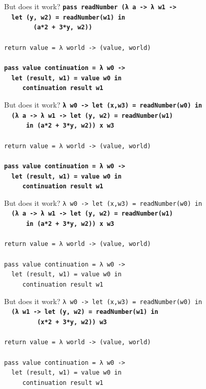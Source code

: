 \documentclass{beamer}
\begin{document}
\begin{frame}{But does it work?}
  \texttt{\textbf{pass readNumber (λ a -> λ w1 ->\\
      \ \ let (y, w2) = readNumber(w1) in\\
      \ \ \ \ \ \ \ \ (a*2 + 3*y, w2))}\\
    \ \\
    return value = λ world -> (value, world) \\
    \ \\
    \textbf{pass value continuation = λ w0 -> \\
      \ \ let (result, w1) = value w0 in \\
      \ \ \ \ \ continuation result w1}
  }
\end{frame}

\begin{frame}{But does it work?}
  \texttt{\textbf{λ w0 -> let (x,w3) = readNumber(w0) in\\
      \ \ (λ a -> λ w1 -> let (y, w2) = readNumber(w1) \\
      \ \ \ \ \ \ in (a*2 + 3*y, w2)) x w3}\\
    \ \\
    return value = λ world -> (value, world) \\
    \ \\
    \textbf{pass value continuation = λ w0 -> \\
      \ \ let (result, w1) = value w0 in \\
      \ \ \ \ \ continuation result w1}
  }
\end{frame}

\begin{frame}{But does it work?}
  \texttt{λ w0 -> let (x,w3) = readNumber(w0) in\\
    \ \ \textbf{(λ a -> λ w1 -> let (y, w2) = readNumber(w1)\\
      \ \ \ \ \ \ in (a*2 + 3*y, w2)) x w3}\\
    \ \\
    return value = λ world -> (value, world) \\
    \ \\
    pass value continuation = λ w0 -> \\
    \ \ let (result, w1) = value w0 in \\
    \ \ \ \ \ continuation result w1
  }
\end{frame}

\begin{frame}{But does it work?}
  \texttt{λ w0 -> let (x,w3) = readNumber(w0) in\\
    \ \ \textbf{(λ w1 -> let (y, w2) = readNumber(w1) in\\
      \ \ \ \ \ \ \ \ \ (x*2 + 3*y, w2)) w3}\\
    \ \\
    return value = λ world -> (value, world) \\
    \ \\
    pass value continuation = λ w0 -> \\
    \ \ let (result, w1) = value w0 in \\
    \ \ \ \ \ continuation result w1
  }
\end{frame}
\end{document}
